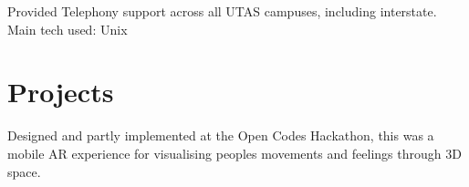 \documentclass[a4paper]{deedy-resume_twopage} %
\begin{document}
\begin{minipage}[t]{0.66\textwidth}
  \sectionspace %


  \item Provided Telephony support across all UTAS campuses, including interstate.
   \\ Main tech used: \textbullet{} Unix

  \sectionspace %



  \section{Projects}


  Designed and partly implemented at the Open Codes Hackathon, this was a mobile AR experience for visualising peoples movements and feelings through 3D space.


\end{minipage}
\end{document}
